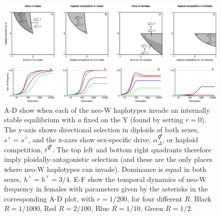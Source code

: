 \documentclass[12pt]{article}
\begin{document}
\begin{landscape}
\begin{figure}[!h]
\centering
\centerline{
\includegraphics[width=\linewidth]{All_plot_combined_PloidAntag.eps}
}
\caption{
A-D show when each of the neo-W haplotypes invade an internally stable equilibrium with $a$ fixed on the Y (found by setting $r=0$).
The y-axis shows directional selection in diploids of both sexes, $s^\female=s^\male$, and the x-axes show sex-specific drive, $\alpha_\Delta^\Hermaphrodite$, or haploid competition, $t^\Hermaphrodite$.
The top left and bottom right quadrants therefore imply ploidally-antagonistic selection (and these are the only places where neo-W haplotypes can invade).
Dominance is equal in both sexes, $h^\female=h^\male=3/4$. 
E-F show the temporal dynamics of neo-W frequency in females with parameters given by the asterisks in the corresponding A-D plot, with $r=1/200$, for four different $R$.
Black $R=1/1000$, Red $R=2/100$, Blue $R=1/10$, Green $R=1/2$.  
}
\label{fig:regionPloidAntag}
\end{figure}
\end{landscape}
\end{document}
